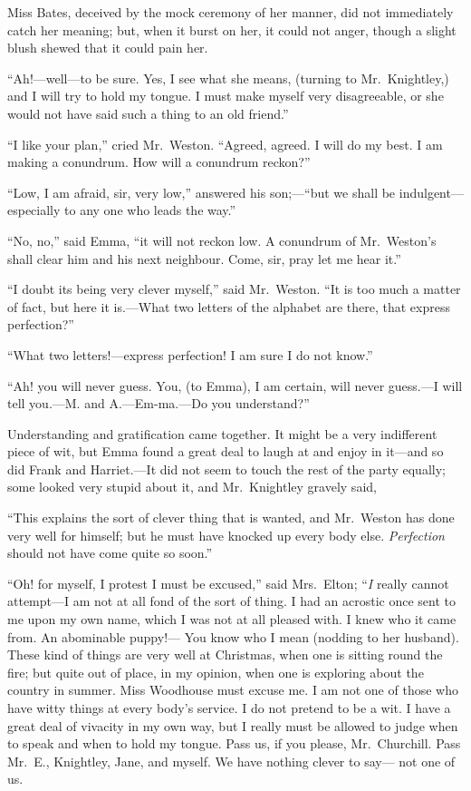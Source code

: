 Miss Bates, deceived by the mock ceremony of her manner, did not
immediately catch her meaning; but, when it burst on her, it could
not anger, though a slight blush shewed that it could pain her.

``Ah!---well---to be sure.  Yes, I see what she means, (turning to
Mr.\ Knightley,) and I will try to hold my tongue.  I must make
myself very disagreeable, or she would not have said such a thing
to an old friend.''

``I like your plan,'' cried Mr.\ Weston.  ``Agreed, agreed.  I will do
my best.  I am making a conundrum.  How will a conundrum reckon?''

``Low, I am afraid, sir, very low,'' answered his son;---``but we shall
be indulgent---especially to any one who leads the way.''

``No, no,'' said Emma, ``it will not reckon low.  A conundrum of
Mr.\ Weston's shall clear him and his next neighbour.  Come, sir,
pray let me hear it.''

``I doubt its being very clever myself,'' said Mr.\ Weston.
``It is too much a matter of fact, but here it is.---What two letters
of the alphabet are there, that express perfection?''

``What two letters!---express perfection!  I am sure I do not know.''

``Ah! you will never guess.  You, (to Emma), I am certain, will
never guess.---I will tell you.---M. and A.---Em-ma.---Do you understand?''

Understanding and gratification came together.  It might be a very
indifferent piece of wit, but Emma found a great deal to laugh
at and enjoy in it---and so did Frank and Harriet.---It did not seem
to touch the rest of the party equally; some looked very stupid
about it, and Mr.\ Knightley gravely said,

``This explains the sort of clever thing that is wanted, and Mr.\ Weston
has done very well for himself; but he must have knocked up every
body else.  \emph{Perfection} should not have come quite so soon.''

``Oh! for myself, I protest I must be excused,'' said Mrs.\ Elton;
``\emph{I} really cannot attempt---I am not at all fond of the sort of thing.
I had an acrostic once sent to me upon my own name, which I was not
at all pleased with.  I knew who it came from.  An abominable puppy!---%
You know who I mean (nodding to her husband). These kind of things
are very well at Christmas, when one is sitting round the fire;
but quite out of place, in my opinion, when one is exploring
about the country in summer.  Miss Woodhouse must excuse me.
I am not one of those who have witty things at every body's service.
I do not pretend to be a wit.  I have a great deal of vivacity
in my own way, but I really must be allowed to judge when to speak
and when to hold my tongue.  Pass us, if you please, Mr.\ Churchill.
Pass Mr.\ E., Knightley, Jane, and myself.  We have nothing clever to say---%
not one of us.

